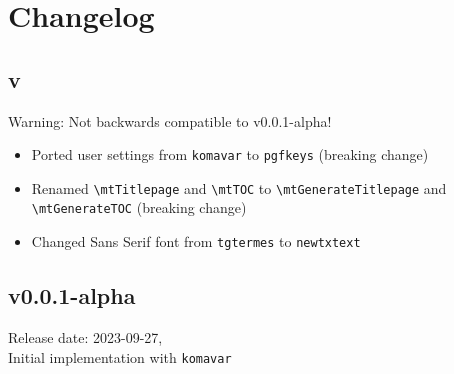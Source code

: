 \chapter{Changelog}
\section{v\releaseVersion}
Warning: Not backwards compatible to v0.0.1-alpha!
\begin{itemize}
	\item Ported user settings from \verb|komavar| to \verb|pgfkeys| (breaking change)
	\item Renamed \verb|\mtTitlepage| and \verb|\mtTOC| to \verb|\mtGenerateTitlepage| and \verb|\mtGenerateTOC| (breaking change)
	\item Changed Sans Serif font from \verb|tgtermes| to \verb|newtxtext| 
\end{itemize}

\section{v0.0.1-alpha}
	Release date: 2023-09-27,\\
	Initial implementation with \verb|komavar|